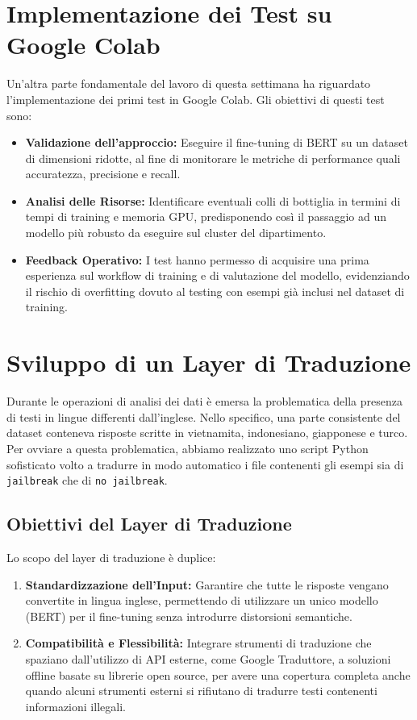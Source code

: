\documentclass[a4paper,12pt]{article}
\begin{document}
\section{Implementazione dei Test su Google Colab}
Un'altra parte fondamentale del lavoro di questa settimana ha riguardato l’implementazione dei primi test in Google Colab. Gli obiettivi di questi test sono:
\begin{itemize}
    \item \textbf{Validazione dell’approccio:} Eseguire il fine-tuning di BERT su un dataset di dimensioni ridotte, al fine di monitorare le metriche di performance quali accuratezza, precisione e recall.
    \item \textbf{Analisi delle Risorse:} Identificare eventuali colli di bottiglia in termini di tempi di training e memoria GPU, predisponendo così il passaggio ad un modello più robusto da eseguire sul cluster del dipartimento.
    \item \textbf{Feedback Operativo:} I test hanno permesso di acquisire una prima esperienza sul workflow di training e di valutazione del modello, evidenziando il rischio di overfitting dovuto al testing con esempi già inclusi nel dataset di training.
\end{itemize}

\section{Sviluppo di un Layer di Traduzione}
Durante le operazioni di analisi dei dati è emersa la problematica della presenza di testi in lingue differenti dall'inglese. Nello specifico, una parte consistente del dataset conteneva risposte scritte in vietnamita, indonesiano, giapponese e turco. Per ovviare a questa problematica, abbiamo realizzato uno script Python sofisticato volto a tradurre in modo automatico i file contenenti gli esempi sia di \texttt{jailbreak} che di \texttt{no jailbreak}.

\subsection{Obiettivi del Layer di Traduzione}
Lo scopo del layer di traduzione è duplice:
\begin{enumerate}
    \item \textbf{Standardizzazione dell'Input:} Garantire che tutte le risposte vengano convertite in lingua inglese, permettendo di utilizzare un unico modello (BERT) per il fine-tuning senza introdurre distorsioni semantiche.
    \item \textbf{Compatibilità e Flessibilità:} Integrare strumenti di traduzione che spaziano dall’utilizzo di API esterne, come Google Traduttore, a soluzioni offline basate su librerie open source, per avere una copertura completa anche quando alcuni strumenti esterni si rifiutano di tradurre testi contenenti informazioni illegali.
\end{enumerate}
\end{document}

